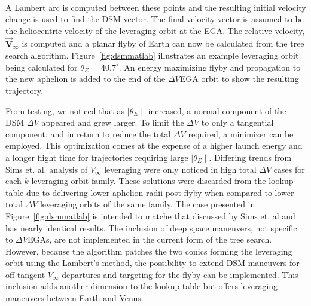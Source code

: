 \documentclass[letterpaper, paper,11pt]{./AAS}		%
\begin{document}
%
\\A Lambert arc is computed between these points and the resulting initial velocity change is used to find the DSM vector. The final velocity vector is assumed to be the heliocentric velocity of the leveraging orbit at the EGA. The relative velocity, $\vec{\textbf{V}}_{\infty}$ is computed and a planar flyby of Earth can now be calculated from the tree search algorithm. Figure~\ref{fig:dsmmatlab} illustrates an example leveraging orbit being calculated for $\theta_{E}$ = 40.$7^{\circ}$. An energy maximizing flyby and propagation to the new aphelion is added to the end of the $\Delta V$EGA orbit to show the resulting trajectory.


From testing, we noticed that as $\mid\theta_E\mid$ increased, a normal component of the DSM $\Delta V$ appeared and grew larger. To limit the $\Delta V$ to only a tangential component, and in return to reduce the total $\Delta V$ required, a minimizer can be employed. This optimization comes at the expense of a higher launch energy and a longer flight time for trajectories requiring large $\mid\theta_E\mid$. Differing trends from Sims et. al. analysis of $V_\infty$ leveraging\cite{sims1994} were only noticed in high total $\Delta V$ cases for each $k$ leveraging orbit family. These solutions were discarded from the lookup table due to delivering lower aphelion radii post-flyby when compared to lower total $\Delta V$ leveraging orbits of the same family. The case presented in Figure~\ref{fig:dsmmatlab} is intended to matche that discussed by Sims et. al\cite{Sims1997} and has nearly identical results. The inclusion of deep space maneuvers, not specific to $\Delta V$EGAs, are not implemented in the current form of the tree search. However, because the algorithm patches the two conics forming the leveraging orbit using the Lambert's method, the possibility to extend DSM maneuvers for off-tangent $V_\infty$ departures and targeting for the flyby can be implemented. This inclusion adds another dimension to the lookup table but offers leveraging maneuvers between Earth and Venus.
\end{document}
